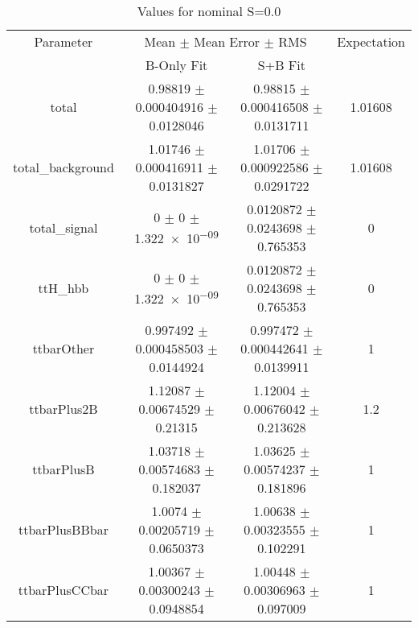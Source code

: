 \begin{table}
\centering
\caption{Values for nominal S=0.0}
\begin{tabular}{cccc}
\toprule
Parameter & \multicolumn{2}{c}{Mean $\pm$ Mean Error $\pm$ RMS} & Expectation\\
 & B-Only Fit & S+B Fit & \\
\midrule
total & \num{0.98819} $\pm$ \num{0.000404916} $\pm$ \num{0.0128046} & \num{0.98815} $\pm$ \num{0.000416508} $\pm$ \num{0.0131711} & \num{1.01608}\\
total\_background & \num{1.01746} $\pm$ \num{0.000416911} $\pm$ \num{0.0131827} & \num{1.01706} $\pm$ \num{0.000922586} $\pm$ \num{0.0291722} & \num{1.01608}\\
total\_signal & \num{0} $\pm$ \num{0} $\pm$ \num{1.322e-09} & \num{0.0120872} $\pm$ \num{0.0243698} $\pm$ \num{0.765353} & \num{0}\\
ttH\_hbb & \num{0} $\pm$ \num{0} $\pm$ \num{1.322e-09} & \num{0.0120872} $\pm$ \num{0.0243698} $\pm$ \num{0.765353} & \num{0}\\
ttbarOther & \num{0.997492} $\pm$ \num{0.000458503} $\pm$ \num{0.0144924} & \num{0.997472} $\pm$ \num{0.000442641} $\pm$ \num{0.0139911} & \num{1}\\
ttbarPlus2B & \num{1.12087} $\pm$ \num{0.00674529} $\pm$ \num{0.21315} & \num{1.12004} $\pm$ \num{0.00676042} $\pm$ \num{0.213628} & \num{1.2}\\
ttbarPlusB & \num{1.03718} $\pm$ \num{0.00574683} $\pm$ \num{0.182037} & \num{1.03625} $\pm$ \num{0.00574237} $\pm$ \num{0.181896} & \num{1}\\
ttbarPlusBBbar & \num{1.0074} $\pm$ \num{0.00205719} $\pm$ \num{0.0650373} & \num{1.00638} $\pm$ \num{0.00323555} $\pm$ \num{0.102291} & \num{1}\\
ttbarPlusCCbar & \num{1.00367} $\pm$ \num{0.00300243} $\pm$ \num{0.0948854} & \num{1.00448} $\pm$ \num{0.00306963} $\pm$ \num{0.097009} & \num{1}\\
\bottomrule
\end{tabular}
\end{table}